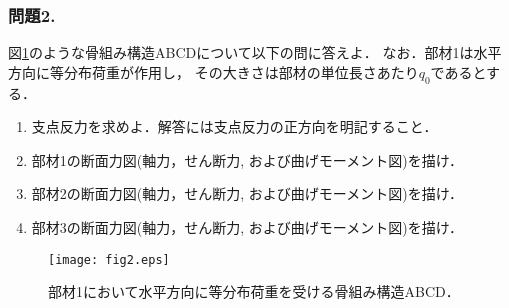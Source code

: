 \documentclass[10pt,a4j]{jarticle}
\begin{document}
\subsubsection*{問題2.}
図\ref{fig:fig2}のような骨組み構造ABCDについて以下の問に答えよ．
なお．部材1は水平方向に等分布荷重が作用し，
その大きさは部材の単位長さあたり$q_0$であるとする．
\begin{enumerate}
\item
	支点反力を求めよ．解答には支点反力の正方向を明記すること．
\item	
	部材1の断面力図(軸力，せん断力, および曲げモーメント図)を描け．
\item	
	部材2の断面力図(軸力，せん断力, および曲げモーメント図)を描け．
\item	
	部材3の断面力図(軸力，せん断力, および曲げモーメント図)を描け．
\end{enumerate}
\begin{figure}[h]
	\begin{center}
	\texttt{[image: fig2.eps]} 
	\end{center}
	\caption{
		部材1において水平方向に等分布荷重を受ける骨組み構造ABCD．
	} 
	\label{fig:fig2}
\end{figure}
\end{document}
